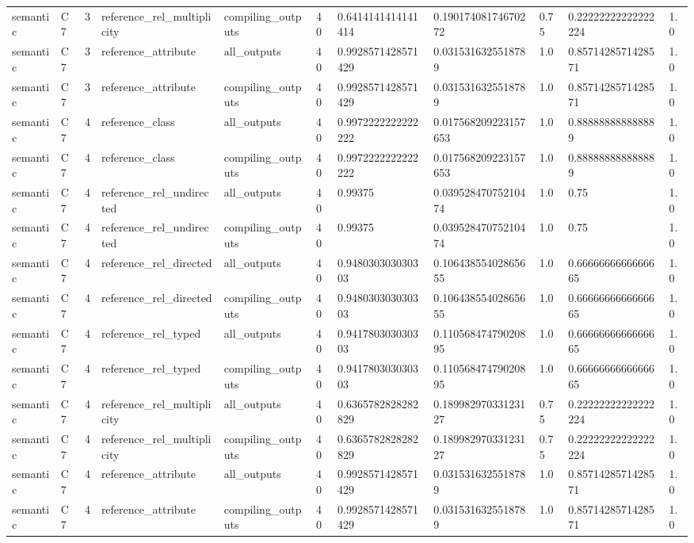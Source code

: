 \begin{tabular}{lllllllllll}
semantic & C7 & 3 & reference\_rel\_multiplicity & compiling\_outputs & 40 & 0.6414141414141414 & 0.19017408174670272 & 0.75 & 0.22222222222222224 & 1.0 \\
semantic & C7 & 3 & reference\_attribute & all\_outputs & 40 & 0.9928571428571429 & 0.0315316325518789 & 1.0 & 0.8571428571428571 & 1.0 \\
semantic & C7 & 3 & reference\_attribute & compiling\_outputs & 40 & 0.9928571428571429 & 0.0315316325518789 & 1.0 & 0.8571428571428571 & 1.0 \\
semantic & C7 & 4 & reference\_class & all\_outputs & 40 & 0.9972222222222222 & 0.017568209223157653 & 1.0 & 0.888888888888889 & 1.0 \\
semantic & C7 & 4 & reference\_class & compiling\_outputs & 40 & 0.9972222222222222 & 0.017568209223157653 & 1.0 & 0.888888888888889 & 1.0 \\
semantic & C7 & 4 & reference\_rel\_undirected & all\_outputs & 40 & 0.99375 & 0.03952847075210474 & 1.0 & 0.75 & 1.0 \\
semantic & C7 & 4 & reference\_rel\_undirected & compiling\_outputs & 40 & 0.99375 & 0.03952847075210474 & 1.0 & 0.75 & 1.0 \\
semantic & C7 & 4 & reference\_rel\_directed & all\_outputs & 40 & 0.948030303030303 & 0.10643855402865655 & 1.0 & 0.6666666666666665 & 1.0 \\
semantic & C7 & 4 & reference\_rel\_directed & compiling\_outputs & 40 & 0.948030303030303 & 0.10643855402865655 & 1.0 & 0.6666666666666665 & 1.0 \\
semantic & C7 & 4 & reference\_rel\_typed & all\_outputs & 40 & 0.941780303030303 & 0.11056847479020895 & 1.0 & 0.6666666666666665 & 1.0 \\
semantic & C7 & 4 & reference\_rel\_typed & compiling\_outputs & 40 & 0.941780303030303 & 0.11056847479020895 & 1.0 & 0.6666666666666665 & 1.0 \\
semantic & C7 & 4 & reference\_rel\_multiplicity & all\_outputs & 40 & 0.6365782828282829 & 0.18998297033123127 & 0.75 & 0.22222222222222224 & 1.0 \\
semantic & C7 & 4 & reference\_rel\_multiplicity & compiling\_outputs & 40 & 0.6365782828282829 & 0.18998297033123127 & 0.75 & 0.22222222222222224 & 1.0 \\
semantic & C7 & 4 & reference\_attribute & all\_outputs & 40 & 0.9928571428571429 & 0.0315316325518789 & 1.0 & 0.8571428571428571 & 1.0 \\
semantic & C7 & 4 & reference\_attribute & compiling\_outputs & 40 & 0.9928571428571429 & 0.0315316325518789 & 1.0 & 0.8571428571428571 & 1.0 \\

\end{tabular}
